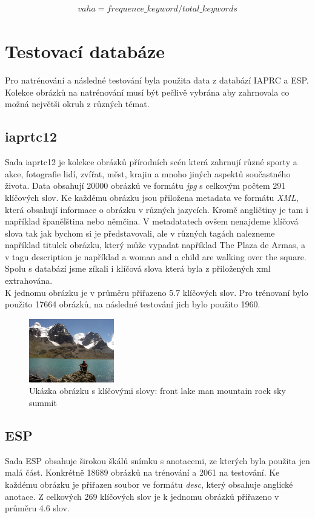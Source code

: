 \documentclass[czech,BP]{thesiskiv}
\begin{document}
\begin{align}
   \label{vaha_klicoveho_slova} vaha = frequence\_keyword / total\_keywords
\end{align}


\chapter{Testovací databáze}
Pro natrénování a následné testování byla použita data z databází IAPRC a ESP. Kolekce obrázků na natrénování musí být pečlivě vybrána aby zahrnovala co možná největši okruh z různých témat. 

\section{iaprtc12}
Sada iaprtc12 je kolekce obrázků přírodních scén která zahrnují různé sporty a akce, fotografie lidí, zvířat, měst, krajin a mnoho jiných aspektů součastného života. Data obsahují \num{20 000} obrázků ve formátu \textit{jpg} s celkovým počtem \num{291} klíčových slov. Ke každému obrázku jsou přiložena metadata ve formátu \textit{XML}, která obsahují informace o obrázku v různých jazycích. Kromě angličtiny je tam i například španělština nebo němčina. V metadatatech ovšem nenajdeme klíčová slova tak jak bychom si je představovali, ale v různých tagách nalezneme například titulek obrázku, který může vypadat například The Plaza de Armas, a v tagu description je například  a woman and a child are walking over the square. Spolu s databází jsme zíkali i klíčová slova která byla z přiložených xml extrahována.\\
K jednomu obrázku je v průměru přiřazeno \num{5.7} klíčových slov. Pro trénovaní bylo použito \num{17 664} obrázků, na následné testování jich bylo použito \num{1960}. 


\begin{figure}[h]
		\centering
		\includegraphics[width=140px]{./img/iaprtc12.jpg}	
		\caption{Ukázka obrázku s klíčovými slovy: front lake man mountain rock sky summit}
\end{figure}

\section{ESP}
\par Sada ESP obsahuje širokou škálů snímku s anotacemi, ze kterých byla použita jen malá část. Konkrétně \num{18 689} obrázků na trénování a \num{2061} na testování. Ke každému obrázku je přiřazen soubor ve formátu \textit{desc}, který obsahuje anglické anotace. Z celkových 269 klíčových slov je k jednomu obrázků přiřazeno v průměru 4.6 slov.
\end{document}
